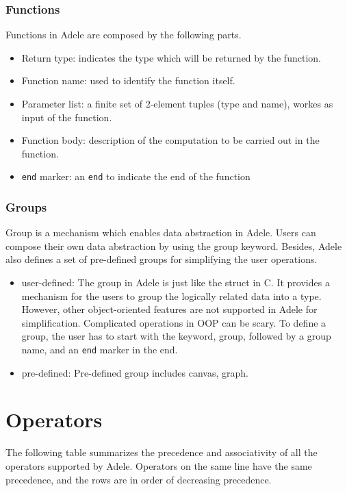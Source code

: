 \documentclass[11pt,letterpaper]{article}
\begin{document}
\subsubsection*{Functions} 
Functions in Adele are composed by the following parts.
	\begin{itemize}
		\item Return type: indicates the type which will be returned by the function.
		\item Function name: used to identify the function itself.
		\item Parameter list: a finite set of 2-element tuples (type and name), workes as input of the function.
		\item Function body: description of the computation to be carried out in the function.
		\item \texttt{end} marker: an \texttt{end} to indicate the end of the function
	\end{itemize}
	
\subsubsection*{Groups}

Group is a mechanism which enables data abstraction in Adele. Users can compose their own data abstraction by using the group keyword. Besides, Adele also defines a set of pre-defined groups for simplifying the user operations.
	\begin{itemize}
		\item user-defined: The group in Adele is just like the struct in C. It provides a mechanism for the users to group the logically related 	data into a type. However, other object-oriented features are not supported in Adele for simplification. Complicated operations in OOP can be scary. To define a group, the user has to start with the keyword, group, followed by a group name, and an \texttt{end} marker in the end.
		\item pre-defined: Pre-defined group includes canvas, graph.
	\end{itemize}

\section {Operators}
The following table summarizes the precedence and associativity of all the operators supported by Adele. Operators on the same line have the same precedence, and the rows are in order of decreasing precedence.
\end{document}
